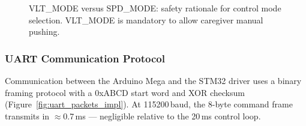 \documentclass[12pt,a4paper]{report}
\newcommand{\xmark}{\ensuremath{\times}}
\begin{document}
\begin{figure}[H]
\centering
{}
\caption{VLT\_MODE versus SPD\_MODE: safety rationale for control mode
  selection. VLT\_MODE is mandatory to allow caregiver manual pushing.}
\label{fig:vlt_vs_spd_impl}
\end{figure}

\subsubsection{UART Communication Protocol}
\label{subsec:uart_protocol_impl}

Communication between the Arduino Mega and the STM32 driver uses a binary
framing protocol with a 0xABCD start word and XOR checksum
(Figure~\ref{fig:uart_packets_impl}). At 115200\,baud, the 8-byte command frame
transmits in $\approx$0.7\,ms — negligible relative to the 20\,ms control loop.
\end{document}
